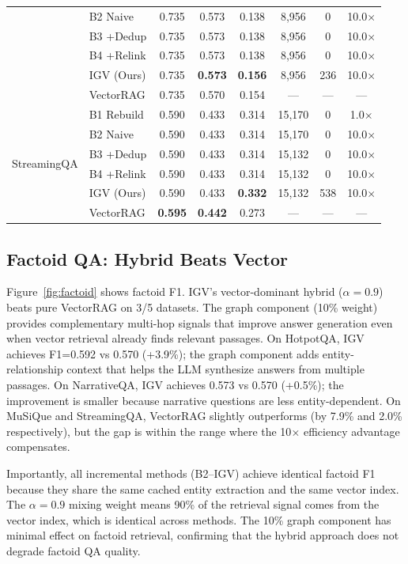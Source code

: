 \documentclass[sigconf,anonymous,review]{acmart}
\begin{document}
\begin{table}[t]
\begin{tabular}{llcccccc}
 & B2 Naive & 0.735 & 0.573 & 0.138 & 8,956 & 0 & 10.0$\times$ \\
 & B3 +Dedup & 0.735 & 0.573 & 0.138 & 8,956 & 0 & 10.0$\times$ \\
 & B4 +Relink & 0.735 & 0.573 & 0.138 & 8,956 & 0 & 10.0$\times$ \\
 & IGV (Ours) & 0.735 & \textbf{0.573} & \textbf{0.156} & 8,956 & 236 & 10.0$\times$ \\
 & VectorRAG & 0.735 & 0.570 & 0.154 & --- & --- & --- \\
\midrule
\multirow{6}{*}{StreamingQA} & B1 Rebuild & 0.590 & 0.433 & 0.314 & 15,170 & 0 & 1.0$\times$ \\
 & B2 Naive & 0.590 & 0.433 & 0.314 & 15,170 & 0 & 10.0$\times$ \\
 & B3 +Dedup & 0.590 & 0.433 & 0.314 & 15,132 & 0 & 10.0$\times$ \\
 & B4 +Relink & 0.590 & 0.433 & 0.314 & 15,132 & 0 & 10.0$\times$ \\
 & IGV (Ours) & 0.590 & 0.433 & \textbf{0.332} & 15,132 & 538 & 10.0$\times$ \\
 & VectorRAG & \textbf{0.595} & \textbf{0.442} & 0.273 & --- & --- & --- \\
\bottomrule
\end{tabular}
\end{table}

\subsection{Factoid QA: Hybrid Beats Vector}

Figure~\ref{fig:factoid} shows factoid F1. IGV's vector-dominant hybrid ($\alpha{=}0.9$) beats pure VectorRAG on 3/5 datasets. The graph component (10\% weight) provides complementary multi-hop signals that improve answer generation even when vector retrieval already finds relevant passages. On HotpotQA, IGV achieves F1=0.592 vs 0.570 (+3.9\%); the graph component adds entity-relationship context that helps the LLM synthesize answers from multiple passages. On NarrativeQA, IGV achieves 0.573 vs 0.570 (+0.5\%); the improvement is smaller because narrative questions are less entity-dependent. On MuSiQue and StreamingQA, VectorRAG slightly outperforms (by 7.9\% and 2.0\% respectively), but the gap is within the range where the 10$\times$ efficiency advantage compensates.

Importantly, all incremental methods (B2--IGV) achieve identical factoid F1 because they share the same cached entity extraction and the same vector index. The $\alpha{=}0.9$ mixing weight means 90\% of the retrieval signal comes from the vector index, which is identical across methods. The 10\% graph component has minimal effect on factoid retrieval, confirming that the hybrid approach does not degrade factoid QA quality.
\end{document}
